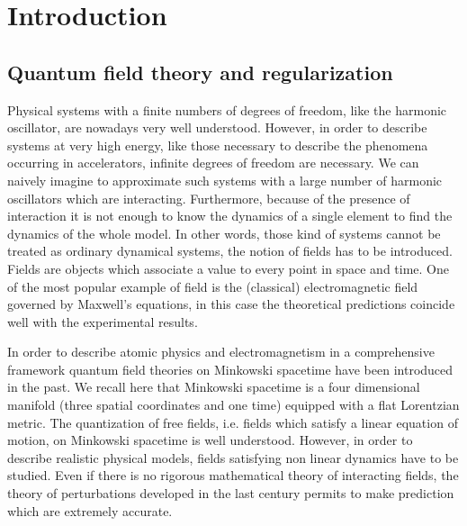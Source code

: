 \documentclass[11pt]{book}
\theoremstyle{break}
\begin{document}
\tableofcontents


\chapter*{Introduction}


\section*{Quantum field theory and regularization}


Physical systems with a finite numbers of degrees of freedom, like the harmonic oscillator, are nowadays very well understood. However, in order to describe systems at very high energy,  like those necessary to describe the phenomena occurring in accelerators, infinite degrees of freedom are necessary. We can naively imagine to approximate such systems with a large number of harmonic oscillators which are interacting. Furthermore, because of the presence of interaction it is not enough to know the dynamics of a single element to find the dynamics of the whole model. In other words, those kind of systems cannot be treated as ordinary dynamical systems, the notion of fields has to be introduced. Fields are objects which associate a value to every point in space and time. One of the most popular example of field is the (classical) electromagnetic field governed by Maxwell’s equations, in this case the theoretical predictions coincide well with the experimental results.\par%


In order to describe atomic physics and electromagnetism in a comprehensive framework quantum field theories on Minkowski spacetime have been introduced in the past. We recall here that Minkowski spacetime is a four dimensional manifold (three spatial coordinates and one time) equipped with a flat Lorentzian metric. The quantization of free fields, i.e. fields which satisfy a linear equation of motion, on Minkowski spacetime is well understood. However, in order to describe realistic physical models, fields satisfying non linear dynamics have to be studied. Even if there is no rigorous mathematical theory of interacting fields, the theory of perturbations developed in the last century permits to make prediction which are extremely accurate.\par%
\end{document}
